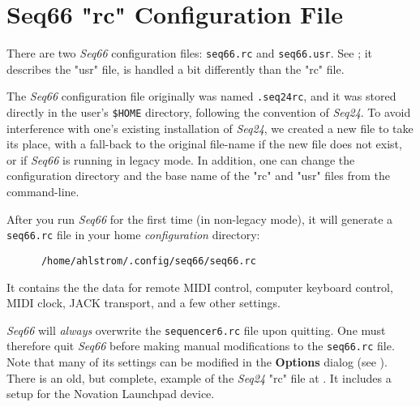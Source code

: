 %
%
%

\section{Seq66 "rc" Configuration File}
\label{sec:rc_file}

   There are two \textsl{Seq66} configuration files:
   \texttt{seq66.rc} and \texttt{seq66.usr}.
   See ; it describes the "usr" file,
   is handled a bit differently than the "rc" file.

   The \textsl{Seq66} configuration file originally was
   named \texttt{.seq24rc},
   and it was stored directly in the user's \texttt{\$HOME} directory,
   following the convention of \textsl{Seq24}.
   To avoid interference with one's existing installation of 
   \textsl{Seq24}, we created a new file
   to take its place, with a fall-back to the original file-name if the new
   file does not exist, or if \textsl{Seq66} is running in
   legacy mode.
   In addition, one can change the configuration directory and the base name of
   the "rc" and "usr" files from the command-line.

   After you run \textsl{Seq66} for the first time (in non-legacy
   mode), it will generate a \texttt{seq66.rc} file in your home
   \textsl{configuration} directory:

   \begin{verbatim}
      /home/ahlstrom/.config/seq66/seq66.rc
   \end{verbatim}

   It contains the the data for remote MIDI control, computer keyboard
   control, MIDI clock, JACK transport, and a few other settings.

   \textsl{Seq66} will
   \textsl{always} overwrite the \texttt{sequencer6.rc} file upon
   quitting.  One must therefore quit \textsl{Seq66} before making
   manual modifications to the \texttt{seq66.rc} file.
   Note that many of
   its settings can be modified in the \textbf{Options} dialog
   (see ).
   There is an old, but complete, example of the \textsl{Seq24}
   "rc" file at \cite{seq24launchpadmapper}.
   It includes a setup for the
   Novation Launchpad device.

